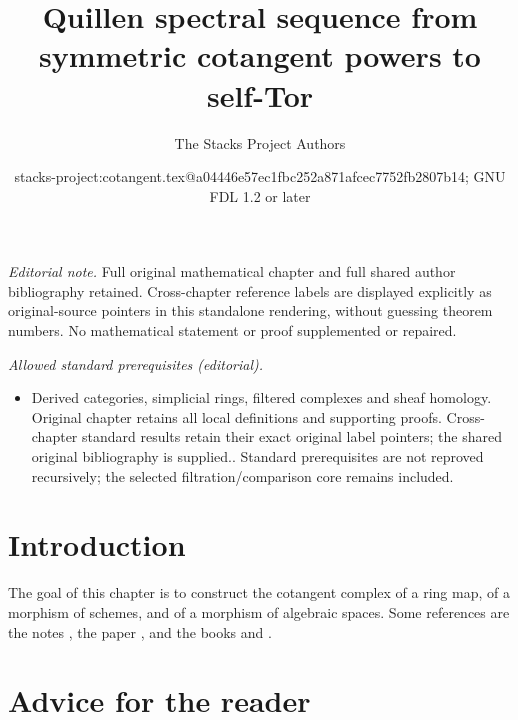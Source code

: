 \documentclass[10pt,a4paper]{article}
\title{Quillen spectral sequence from symmetric cotangent powers to self-Tor}
\author{The Stacks Project Authors}
\date{stacks-project:cotangent.tex@a04446e57ec1fbc252a871afcec7752fb2807b14; GNU FDL 1.2 or later}
\theoremstyle{plain}
\theoremstyle{definition}
\theoremstyle{remark}
\numberwithin{equation}{subsection}
\begin{document}
\maketitle
\noindent\textit{Editorial note.} Full original mathematical chapter and full shared author bibliography retained. Cross-chapter reference labels are displayed explicitly as original-source pointers in this standalone rendering, without guessing theorem numbers. No mathematical statement or proof supplemented or repaired.\par\medskip
\noindent\textit{Allowed standard prerequisites (editorial).}\begin{itemize}
\item Derived categories, simplicial rings, filtered complexes and sheaf homology. Original chapter retains all local definitions and supporting proofs. Cross-chapter standard results retain their exact original label pointers; the shared original bibliography is supplied.. Standard prerequisites are not reproved recursively; the selected filtration/comparison core remains included.
\end{itemize}\medskip
\section{Introduction}
\label{section-introduction}

\noindent
The goal of this chapter is to construct the cotangent complex of a
ring map, of a morphism of schemes, and of a morphism of algebraic spaces.
Some references are the notes \cite{quillenhomology}, the paper
\cite{quillencohomology}, and the books
\cite{Andre} and \cite{cotangent}.




\section{Advice for the reader}
\label{section-advice-reader}
\end{document}
